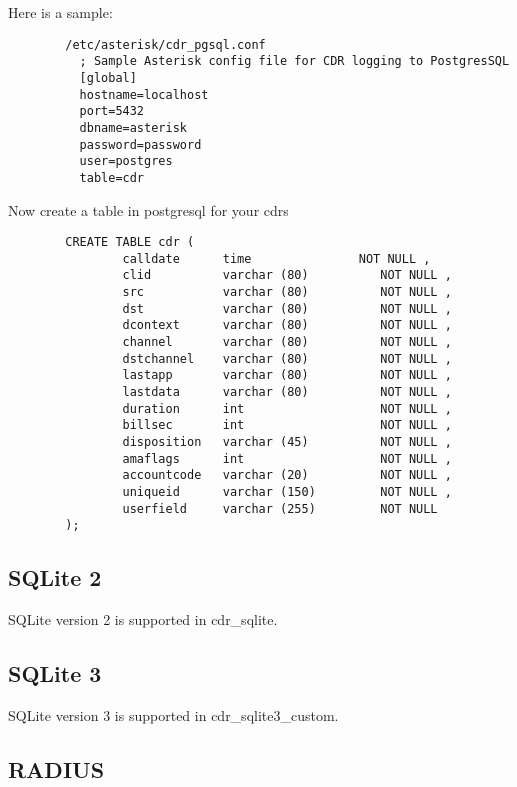         Here is a sample:
\begin{astlisting}
\begin{verbatim}
        /etc/asterisk/cdr_pgsql.conf
          ; Sample Asterisk config file for CDR logging to PostgresSQL
          [global]
          hostname=localhost
          port=5432
          dbname=asterisk
          password=password
          user=postgres
          table=cdr
\end{verbatim}
\end{astlisting}
        Now create a table in postgresql for your cdrs
\begin{astlisting}
\begin{verbatim}
        CREATE TABLE cdr (
                calldate      time               NOT NULL ,
                clid          varchar (80)          NOT NULL ,
                src           varchar (80)          NOT NULL ,
                dst           varchar (80)          NOT NULL ,
                dcontext      varchar (80)          NOT NULL ,
                channel       varchar (80)          NOT NULL ,
                dstchannel    varchar (80)          NOT NULL ,
                lastapp       varchar (80)          NOT NULL ,
                lastdata      varchar (80)          NOT NULL ,
                duration      int                   NOT NULL ,
                billsec       int                   NOT NULL ,
                disposition   varchar (45)          NOT NULL ,
                amaflags      int                   NOT NULL ,
                accountcode   varchar (20)          NOT NULL ,
                uniqueid      varchar (150)         NOT NULL ,
                userfield     varchar (255)         NOT NULL
        );
\end{verbatim}
\end{astlisting}

\subsection{SQLite 2}

SQLite version 2 is supported in cdr_sqlite.

\subsection{SQLite 3}

SQLite version 3 is supported in cdr_sqlite3\_custom.

\subsection{RADIUS}

